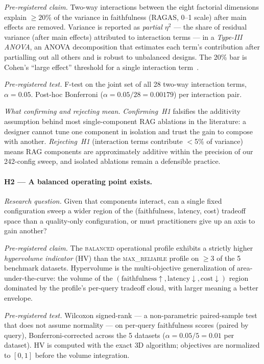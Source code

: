 \documentclass[11pt]{article}
\begin{document}
\textit{Pre-registered claim.} Two-way interactions between the eight
factorial dimensions explain $\geq 20\%$ of the variance in
faithfulness (RAGAS, 0--1 scale) after main effects are removed.
Variance is reported as \emph{partial $\eta^2$} --- the share of
residual variance (after main effects) attributed to interaction
terms --- in a \emph{Type-III ANOVA}, an ANOVA decomposition that
estimates each term's contribution after partialling out all others
and is robust to unbalanced designs.  The 20\% bar is Cohen's ``large
effect'' threshold for a single interaction term~\citep{cohen1988statistical}.

\textit{Pre-registered test.} F-test on the joint set of all 28
two-way interaction terms, $\alpha = 0.05$.  Post-hoc Bonferroni
($\alpha = 0.05 / 28 = 0.00179$) per interaction pair.

\textit{What confirming and rejecting mean.} \emph{Confirming~H1}
falsifies the additivity assumption behind most single-component RAG
ablations in the literature: a designer cannot tune one component in
isolation and trust the gain to compose with another.
\emph{Rejecting~H1} (interaction terms contribute $<$5\% of variance)
means RAG components are approximately additive within the precision
of our 242-config sweep, and isolated ablations remain a defensible
practice.

\paragraph{H2 --- A balanced operating point exists.}

\textit{Research question.} Given that components interact, can a
single fixed configuration sweep a wider region of the (faithfulness,
latency, cost) tradeoff space than a quality-only configuration, or
must practitioners give up an axis to gain another?

\textit{Pre-registered claim.} The \textsc{balanced} operational
profile exhibits a strictly higher \emph{hypervolume indicator} (HV)
than the \textsc{max\_reliable} profile on $\geq 3$ of the 5 benchmark
datasets.  Hypervolume is the multi-objective generalization of
area-under-the-curve: the volume of the
$(\text{faithfulness}{\uparrow}, \text{latency}{\downarrow}, \text{cost}{\downarrow})$
region dominated by the profile's per-query tradeoff cloud, with
larger meaning a better envelope.

\textit{Pre-registered test.} Wilcoxon signed-rank --- a non-parametric
paired-sample test that does not assume normality --- on per-query
faithfulness scores (paired by query), Bonferroni-corrected across
the 5 datasets ($\alpha = 0.05 / 5 = 0.01$ per dataset).  HV is
computed with the exact 3D algorithm; objectives are normalized to
$[0,1]$ before the volume integration.
\end{document}
